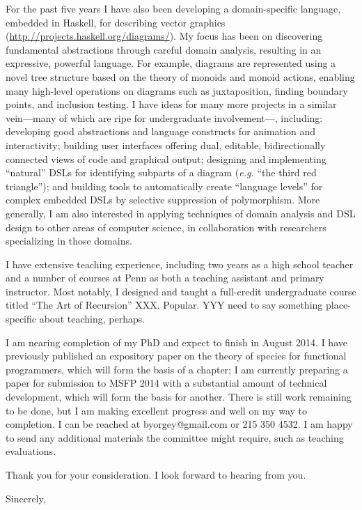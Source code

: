 \begin{letter}{\thereaddress}
For the past five years I have also been developing a domain-specific
language, embedded in Haskell, for describing vector graphics
(\url{http://projects.haskell.org/diagrams/}).  My focus has been on
discovering fundamental abstractions through careful domain analysis,
resulting in an expressive, powerful language. For example, diagrams
are represented using a novel tree structure based on the theory of
monoids and monoid actions, enabling many high-level operations on
diagrams such as juxtaposition, finding boundary points, and inclusion
testing.  I have ideas for many more projects in a similar
vein\ifteaching---many of which are ripe for undergraduate
involvement---\else, \fi including: developing good abstractions and
language constructs for animation and interactivity; building user
interfaces offering dual, editable, bidirectionally connected views of
code and graphical output; designing and implementing ``natural'' DSLs
for identifying subparts of a diagram (\emph{e.g.} ``the third red
triangle''); and building tools to automatically create ``language
levels'' for complex embedded DSLs by selective suppression of
polymorphism.  More generally, I am also interested in applying
techniques of domain analysis and DSL design to other areas of
computer science, in collaboration with researchers specializing in
those domains.  \fi %

\ifteaching
I have extensive teaching experience, including two years as a high
school teacher and a number of courses at Penn as both a teaching
assistant and primary instructor.  Most notably, I designed and taught
a full-credit undergraduate course titled ``The Art of Recursion''
XXX.  Popular.  YYY need to say something place-specific about
teaching, perhaps.
\fi %

\placespecific

I am nearing completion of my PhD and expect to finish in August 2014.
I have previously published an expository paper on the theory of
species for functional programmers, which will form the basis of a
chapter; I am currently preparing a paper for submission to MSFP 2014
with a substantial amount of technical development, which will form
the basis for another.  There is still work remaining to be done, but
I am making excellent progress and well on my way to completion. I
can be reached at \textsf{byorgey@gmail.com} or \textsf{215 350 4532}.
I am happy to send any additional materials the committee might
require\ifteaching, such as teaching evaluations\fi.

Thank you for your consideration.  I look forward to hearing from you.

\closing{Sincerely,}

\end{letter}


